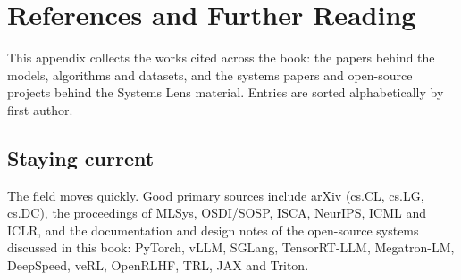 \chapter{References and Further Reading}\label{app:refs}

This appendix collects the works cited across the book: the papers behind the models, algorithms
and datasets, and the systems papers and open-source projects behind the Systems Lens material.
Entries are sorted alphabetically by first author.

\section*{Staying current}
The field moves quickly. Good primary sources include arXiv (cs.CL, cs.LG, cs.DC), the
proceedings of MLSys, OSDI/SOSP, ISCA, NeurIPS, ICML and ICLR, and the documentation and design notes of the
open-source systems discussed in this book: PyTorch, vLLM, SGLang, TensorRT-LLM, Megatron-LM,
DeepSpeed, veRL, OpenRLHF, TRL, JAX and Triton.

